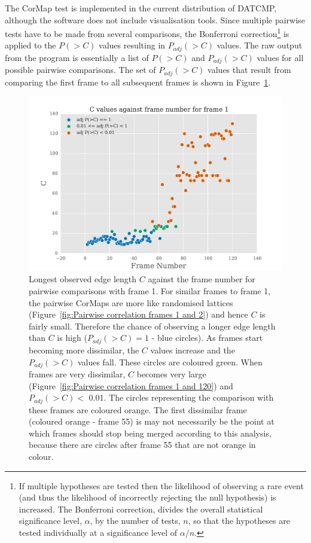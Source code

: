 The CorMap test is implemented in the current distribution of DATCMP, although the software does not include visualisation tools.
Since multiple pairwise tests have to be made from several comparisons, the Bonferroni correction\footnote{If multiple hypotheses are tested then the likelihood of observing a rare event (and thus the likelihood of incorrectly rejecting the null hypothesis) is increased. The Bonferroni correction, divides the overall statistical significance level, $\alpha$, by the number of tests, $n$, so that the hypotheses are tested individually at a significance level of $\alpha/n$.} is applied to the $P(>C)$ values resulting in $P_{adj}(>C)$ values.
The raw output from the program is essentially a list of $P(>C)$ and $P_{adj}(>C)$ values for all possible pairwise comparisons.
The set of $P_{adj}(>C)$ values that result from comparing the first frame to all subsequent frames is shown in Figure~\ref{fig:p values for comparisons with frame 1}.
\begin{figure}
    \centering
    \includegraphics[width=1.0\textwidth]{figures/saxs/scatter_asc_10.pdf}
    \caption[Longest observed edge length against the frame number for pairwise comparisons with frame 1.]{Longest observed edge length $C$ against the frame number for pairwise comparisons with frame 1.
    For similar frames to frame 1, the pairwise CorMaps are more like randomised lattices (Figure~\ref{fig:Pairwise correlation frames 1 and 2}) and hence $C$ is fairly small.
    Therefore the chance of observing a longer edge length than $C$ is high ($P_{adj}(>C) = 1$ - blue circles).
    As frames start becoming more dissimilar, the $C$ values increase and the $P_{adj}(>C)$ values fall.
    These circles are coloured green.
    When frames are very dissimilar, $C$ becomes very large (Figure~\ref{fig:Pairwise correlation frames 1 and 120}) and $P_{adj}(>C) <$ 0.01.
    The circles representing the comparison with these frames are coloured orange.
    The first dissimilar frame (coloured orange - frame 55) is may not necessarily be the point at which frames should stop being merged according to this analysis, because there are circles after frame 55 that are not orange in colour.}
    \label{fig:p values for comparisons with frame 1}
\end{figure}

